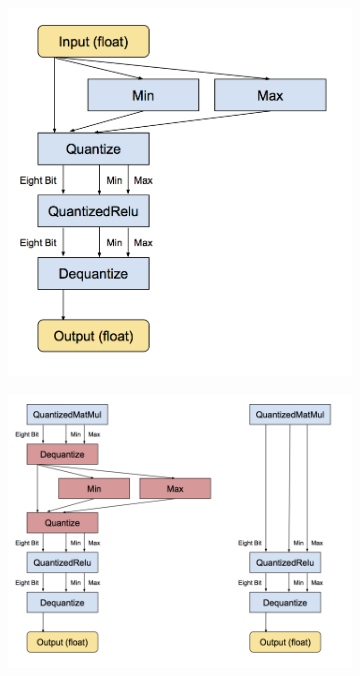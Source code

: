 	\begin{figure}
		\begin{subfigure}{.4\textwidth}
			\centering
			\includegraphics[width=1\linewidth]{images/quantization1}
			\caption{}
			\label{Fig:quantizationb}
		\end{subfigure}
		\begin{subfigure}{.6\textwidth}
			\centering
			\includegraphics[width=1\linewidth]{images/quantization2}

\end{subfigure}
\end{figure}
